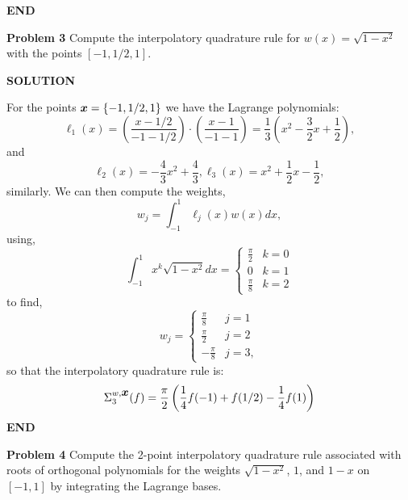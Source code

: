 \documentclass[12pt,a4paper]{article}
\def\x{ {\vc x} }
\begin{document}
\textbf{END}

\textbf{Problem 3} Compute the interpolatory quadrature rule for $w(x) = \sqrt{1-x^2}$ with the points $[-1,1/2,1]$.

\textbf{SOLUTION}

For the points $\ensuremath{\bm{\x}} = \{-1, 1/2, 1\}$ we have the Lagrange polynomials:
\[
\ensuremath{\ell}_1(x) = \left(\frac{x - 1/2}{-1 - 1/2}\right)\cdot\left(\frac{x - 1}{-1 - 1}\right) = \frac{1}{3}\left(x^2 - \frac{3}{2}x + \frac{1}{2}\right),
\]
and
\[
\ensuremath{\ell}_2(x) = -\frac{4}{3}x^2 + \frac{4}{3}, \ensuremath{\ell}_3(x) =x^2 + \frac{1}{2}x - \frac{1}{2},
\]
similarly. We can then compute the weights,
\[
w_j = \int_{-1}^1 \ensuremath{\ell}_j(x)w(x)dx,
\]
using,
\[
\int_{-1}^1 x^k \sqrt{1-x^2}dx = \begin{cases}
 \frac{\ensuremath{\pi}}{2} &	k=0 \\
 0 & k=1 \\
\frac{\ensuremath{\pi}}{8} & k=2
 \end{cases}
\]
to find,
\[
w_j = \begin{cases}
 	\frac{\ensuremath{\pi}}{8} & j = 1 \\
 	\frac{\ensuremath{\pi}}{2} & j = 2 \\
 	-\frac{\ensuremath{\pi}}{8} & j = 3,
 \end{cases}
\]
so that the interpolatory quadrature rule is:
\[
\ensuremath{\Sigma}_3^{w,\ensuremath{\bm{\x}}}(f) = \frac{\ensuremath{\pi}}{2}\left(\frac{1}{4}f(-1) + f(1/2) -\frac{1}{4}f(1) \right)
\]
\textbf{END}

\textbf{Problem 4} Compute the 2-point interpolatory quadrature rule associated with roots of orthogonal polynomials for the weights $\sqrt{1-x^2}$, $1$, and $1-x$ on $[-1,1]$ by integrating the Lagrange bases.
\end{document}
